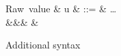 \begin{figure}
\begin{syntaxfig}
\mbox{Raw value}
&
u
&
::=
&
\ldots
\\
&&&
\exClosure{\rho}{\delta}{\sigma}
&
\end{syntaxfig}
\caption{Additional syntax}
\end{figure}
